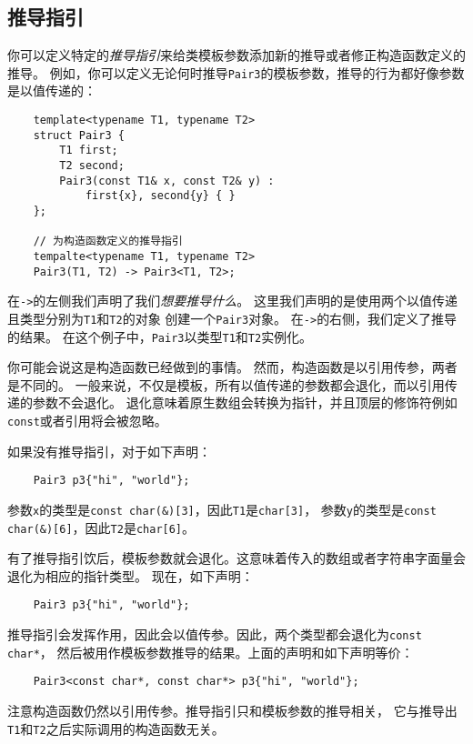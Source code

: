 \subsection{推导指引}
你可以定义特定的\emph{推导指引}来给类模板参数添加新的推导或者修正构造函数定义的推导。
例如，你可以定义无论何时推导\texttt{Pair3}的模板参数，推导的行为都好像参数是以值传递的：
\begin{lstlisting}
    template<typename T1, typename T2>
    struct Pair3 {
        T1 first;
        T2 second;
        Pair3(const T1& x, const T2& y) :
            first{x}, second{y} { }
    };

    // 为构造函数定义的推导指引
    tempalte<typename T1, typename T2>
    Pair3(T1, T2) -> Pair3<T1, T2>;
\end{lstlisting}
在\texttt{->}的左侧我们声明了我们\emph{想要推导什么}。
这里我们声明的是使用两个以值传递且类型分别为\texttt{T1}和\texttt{T2}的对象
创建一个\texttt{Pair3}对象。
在\texttt{->}的右侧，我们定义了推导的结果。
在这个例子中，\texttt{Pair3}以类型\texttt{T1}和\texttt{T2}实例化。

你可能会说这是构造函数已经做到的事情。
然而，构造函数是以引用传参，两者是不同的。
一般来说，不仅是模板，所有以值传递的参数都会退化，而以引用传递的参数不会退化。
退化意味着原生数组会转换为指针，并且顶层的修饰符例如\texttt{const}或者引用将会被忽略。

如果没有推导指引，对于如下声明：
\begin{lstlisting}
    Pair3 p3{"hi", "world"};
\end{lstlisting}
参数\texttt{x}的类型是\texttt{const char(\&)[3]}，因此\texttt{T1}是\texttt{char[3]}，
参数\texttt{y}的类型是\texttt{const char(\&)[6]}，因此\texttt{T2}是\texttt{char[6]}。

有了推导指引饮后，模板参数就会退化。这意味着传入的数组或者字符串字面量会退化为相应的指针类型。
现在，如下声明：
\begin{lstlisting}
    Pair3 p3{"hi", "world"};
\end{lstlisting}
推导指引会发挥作用，因此会以值传参。因此，两个类型都会退化为\texttt{const char*}，
然后被用作模板参数推导的结果。上面的声明和如下声明等价：
\begin{lstlisting}
    Pair3<const char*, const char*> p3{"hi", "world"};
\end{lstlisting}
注意构造函数仍然以引用传参。推导指引只和模板参数的推导相关，
它与推导出\texttt{T1}和\texttt{T2}之后实际调用的构造函数无关。

